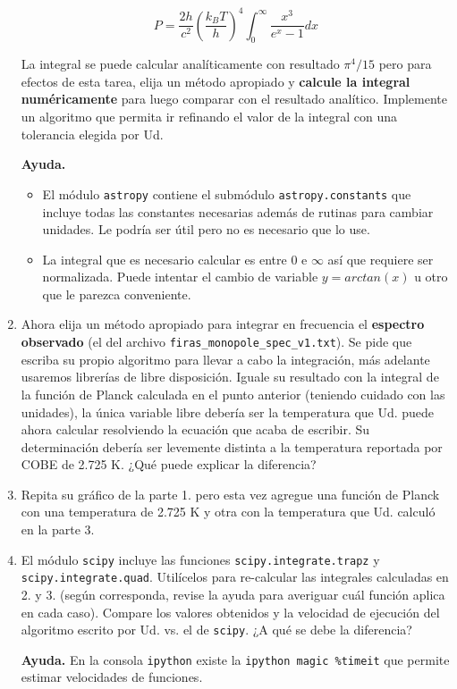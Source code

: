 \documentclass[letter, 11pt]{article}
\begin{document}
\begin{enumerate}
    $$P = \frac{2 h}{c^2} \left(\frac{k_BT}{h}\right)^4
    \int_0^\infty\frac{x^3}{e^x - 1} dx $$

    La integral se puede calcular analíticamente con resultado $\pi^4/15$ pero
    para efectos de esta tarea, elija un método apropiado y {\bf calcule la
    integral numéricamente} para luego comparar con el resultado analítico.
    Implemente un algoritmo que permita ir refinando el valor de la integral
    con una tolerancia elegida por Ud.

    \begin{ayuda}
      \small
      {\bf Ayuda.}
      \begin{itemize}
        \item El módulo \texttt{astropy} contiene el submódulo
          \texttt{astropy.constants} que incluye todas las constantes
          necesarias además de rutinas para cambiar unidades. Le podría ser
          útil pero no es necesario que lo use.
        \item La integral que es necesario calcular es entre $0$ e $\infty$ así
          que requiere ser normalizada. Puede intentar el cambio de variable $y
          = arctan(x)$ u otro que le parezca conveniente.
      \end{itemize}
    \end{ayuda}

  \item Ahora elija un método apropiado para integrar en frecuencia el {\bf
    espectro observado} (el del archivo
    \texttt{firas\_monopole\_spec\_v1.txt}). Se pide que escriba su propio
    algoritmo para llevar a cabo la integración, más adelante usaremos
    librerías de libre disposición.  Iguale su resultado con la integral de la
    función de Planck calculada en el punto anterior (teniendo cuidado con las
    unidades), la única variable libre debería ser la temperatura que Ud. puede
    ahora calcular resolviendo la ecuación que acaba de escribir. Su
    determinación debería ser levemente distinta a la temperatura reportada por
    COBE de 2.725 K. ¿Qué puede explicar la diferencia?

  \item Repita su gráfico de la parte 1. pero esta vez agregue una función de
    Planck con una temperatura de 2.725 K y otra con la temperatura que Ud.
    calculó en la parte 3.

  \item El módulo \texttt{scipy} incluye las funciones
    \texttt{scipy.integrate.trapz} y \texttt{scipy.integrate.quad}.  Utilícelos
    para re-calcular las integrales calculadas en 2. y 3. (según corresponda,
    revise la ayuda para averiguar cuál función aplica en cada caso). Compare
    los valores obtenidos y la velocidad de ejecución del algoritmo escrito por
    Ud. vs. el de \texttt{scipy}. ¿A qué se debe la diferencia?

      \begin{ayuda}
        \small
        {\bf Ayuda.}
        En la consola \texttt{ipython} existe la \texttt{ipython magic
        \%timeit} que permite estimar velocidades de funciones.
      \end{ayuda}

\end{enumerate}
\end{document}
